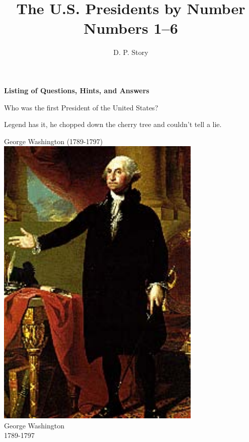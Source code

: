 \documentclass{article}
\author{D. P. Story}
\title{The U.S. Presidents by Number\texorpdfstring{\\}{,} Numbers 1--6}
\def\rescale{.4} %
\begin{document}
\maketitle

\ifecListing
    \begin{center}\Large\bfseries
        Listing of Questions, Hints, and Answers
    \end{center}\bigskip
\fi

\begin{card}
    Who was the first President of the United States?
\begin{response}
    \begin{hint}
        Legend has it, he chopped down the cherry tree and couldn't tell a lie.
    \end{hint}
    \begin{answer}
    \ifecListing
        George Washington (1789-1797)
    \else\centering
            \includegraphics[scale=\rescale]{presidents/gw1}\\
                George Washington\\
                1789-1797
    \fi
    \end{answer}
\end{response}
\end{card}
\end{document}
